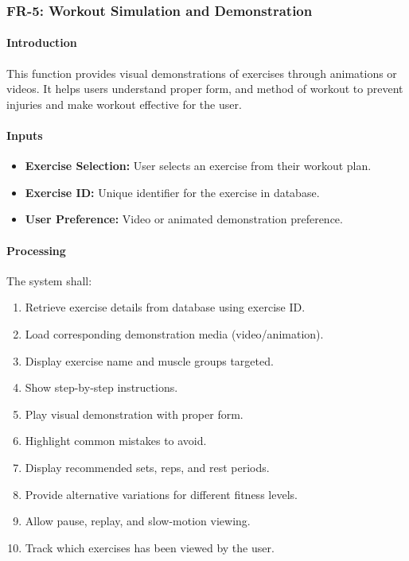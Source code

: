 \documentclass[12pt,a4paper]{article}
\begin{document}
\subsubsection{FR-5: Workout Simulation and Demonstration}

\paragraph{Introduction}
This function provides visual demonstrations of exercises through animations or videos. It helps users understand proper form, and method of workout to prevent injuries and make workout effective for the user.

\paragraph{Inputs}
\begin{itemize}
    \item \textbf{Exercise Selection:} User selects an exercise from their workout plan.
    \item \textbf{Exercise ID:} Unique identifier for the exercise in database.
    \item \textbf{User Preference:} Video or animated demonstration preference.
\end{itemize}

\paragraph{Processing}
The system shall:
\begin{enumerate}
    \item Retrieve exercise details from database using exercise ID.
    \item Load corresponding demonstration media (video/animation).
    \item Display exercise name and muscle groups targeted.
    \item Show step-by-step instructions.
    \item Play visual demonstration with proper form.
    \item Highlight common mistakes to avoid.
    \item Display recommended sets, reps, and rest periods. %
    \item Provide alternative variations for different fitness levels.
    \item Allow pause, replay, and slow-motion viewing.
    \item Track which exercises has been viewed by the user.
\end{enumerate}
\end{document}
